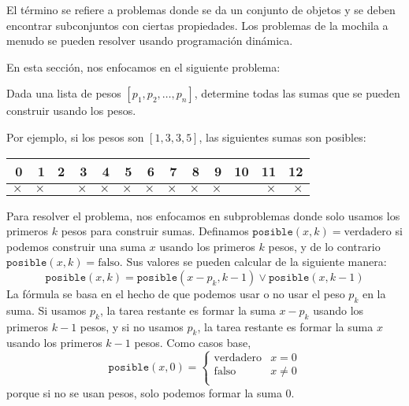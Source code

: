 
El término  se refiere a problemas donde
se da un conjunto de objetos y
se deben encontrar subconjuntos con ciertas propiedades.
Los problemas de la mochila a menudo se pueden resolver
usando programación dinámica.

En esta sección, nos enfocamos en el siguiente
problema:

\begin{framed}
    \noindent Dada una lista de pesos
    $[p_1,p_2,\ldots,p_n]$, determine todas
    las sumas que se pueden construir usando los pesos.
\end{framed}

Por ejemplo, si los pesos son
$[1,3,3,5]$, las siguientes sumas son posibles:

\begin{center}
    \begin{tabular}{rrrrrrrrrrrrr}
        0        & 1        & 2 & 3        & 4        & 5        & 6        & 7        & 8        & 9        & 10 & 11       & 12       \\
        \hline
        $\times$ & $\times$ &   & $\times$ & $\times$ & $\times$ & $\times$ & $\times$ & $\times$ & $\times$ &    & $\times$ & $\times$ \\
    \end{tabular}
\end{center}

Para resolver el problema, nos enfocamos en subproblemas
donde solo usamos los primeros $k$ pesos
para construir sumas.
Definamos $\texttt{posible}(x,k)=\textrm{verdadero}$ si
podemos construir una suma $x$
usando los primeros $k$ pesos,
y de lo contrario $\texttt{posible}(x,k)=\textrm{falso}$.
Sus valores se pueden calcular de la siguiente manera:
\[ \texttt{posible}(x,k) = \texttt{posible}(x-p_k,k-1) \lor \texttt{posible}(x,k-1) \]
La fórmula se basa en el hecho de que podemos
usar o no usar el peso $p_k$ en la suma.
Si usamos $p_k$, la tarea restante es formar
la suma $x-p_k$ usando los primeros $k-1$ pesos,
y si no usamos $p_k$,
la tarea restante es formar la suma $x$
usando los primeros $k-1$ pesos.
Como casos base,
\begin{equation*}
    \texttt{posible}(x,0) = \begin{cases}
        \textrm{verdadero} & x = 0    \\
        \textrm{falso}     & x \neq 0 \\
    \end{cases}
\end{equation*}
porque si no se usan pesos,
solo podemos formar la suma 0.

